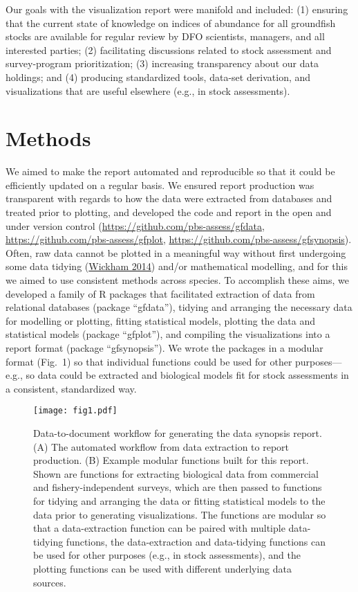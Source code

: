 \documentclass[12pt,]{article}
\begin{document}
Our goals with the visualization report were manifold and included:
(1) ensuring that the current state of knowledge on indices of abundance for all groundfish stocks are available for regular review by DFO scientists, managers, and all interested parties;
(2) facilitating discussions related to stock assessment and survey-program prioritization;
(3) increasing transparency about our data holdings; and
(4) producing standardized tools, data-set derivation, and visualizations that are useful elsewhere (e.g., in stock assessments).

\hypertarget{methods}{%
\section*{Methods}\label{methods}}

We aimed to make the report automated and reproducible so that it could be efficiently updated on a regular basis. We ensured report production was transparent with regards to how the data were extracted from databases and treated prior to plotting, and developed the code and report in the open and under version control (\url{https://github.com/pbs-assess/gfdata}, \url{https://github.com/pbs-assess/gfplot}, \url{https://github.com/pbs-assess/gfsynopsis}). Often, raw data cannot be plotted in a meaningful way without first undergoing some data tidying (\protect\hyperlink{ref-wickham2014}{Wickham 2014}) and/or mathematical modelling, and for this we aimed to use consistent methods across species. To accomplish these aims, we developed a family of R packages that facilitated extraction of data from relational databases (package ``gfdata''), tidying and arranging the necessary data for modelling or plotting, fitting statistical models, plotting the data and statistical models (package ``gfplot''), and compiling the visualizations into a report format (package ``gfsynopsis''). We wrote the packages in a modular format (Fig.~1) so that individual functions could be used for other purposes---e.g., so data could be extracted and biological models fit for stock assessments in a consistent, standardized way.

\begin{figure}[htb!]
\centering
\texttt{[image: fig1.pdf]}
\caption{Data-to-document workflow for generating the data synopsis report. (A) The automated workflow from data extraction to report production.
(B) Example modular functions built for this report.
Shown are functions for extracting biological data from commercial and fishery-independent surveys, which are then passed to functions for tidying and arranging the data or fitting statistical models to the data prior to generating visualizations.
The functions are modular so that a data-extraction function can be paired with multiple data-tidying functions, the data-extraction and data-tidying functions can be used for other purposes (e.g., in stock assessments), and the plotting functions can be used with different underlying data sources.}
\label{fig:fig1}
\end{figure}
\end{document}
